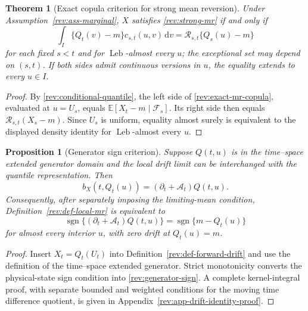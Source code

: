 \documentclass[11pt]{article}
\newtheorem{theorem}[definition]{Theorem}
\newtheorem{proposition}[definition]{Proposition}
\theoremstyle{remark}
\newcommand{\E}{\mathbb E}
\newcommand{\dd}{\,\mathrm d}
\newcommand{\sgn}{\operatorname{sgn}}
\newcommand{\Leb}{\operatorname{Leb}}
\begin{document}
\begin{theorem}[Exact copula criterion for strong mean reversion]
\label{rev:thm-exact-mr}
Under Assumption~\ref{rev:ass-marginal}, $X$ satisfies
\eqref{rev:strong-mr} if and only if
\begin{equation}
\int_I\{Q_t(v)-m\}c_{s,t}(u,v)\dd v
=\mathcal R_{s,t}\{Q_s(u)-m\}
\label{rev:exact-mr-copula}
\end{equation}
for each fixed $s<t$ and for $\Leb$-almost every $u$; the exceptional set may
depend on $(s,t)$.  If both sides admit continuous versions in $u$, the equality
extends to every $u\in I$.
\end{theorem}

\begin{proof}
By \eqref{rev:conditional-quantile}, the left side of
\eqref{rev:exact-mr-copula}, evaluated at $u=U_s$, equals
$\E[X_t-m\mid\mathcal F_s]$.  Its right side then equals
$\mathcal R_{s,t}(X_s-m)$.  Since $U_s$ is uniform, equality almost surely is
equivalent to the displayed density identity for $\Leb$-almost every $u$.
\end{proof}

\begin{proposition}[Generator sign criterion]
\label{rev:prop-generator-sign}
Suppose $Q(t,u)$ is in the time--space extended generator domain and the local
drift limit can be interchanged with the quantile representation.  Then
\begin{equation}
b_X(t,Q_t(u))=(\partial_t+\mathcal A_t)Q(t,u).
\label{rev:drift-quantile-generator}
\end{equation}
Consequently, after separately imposing the limiting-mean condition,
Definition~\ref{rev:def-local-mr} is equivalent to
\begin{equation}
\sgn\{(\partial_t+\mathcal A_t)Q(t,u)\}
=\sgn\{m-Q_t(u)\}
\label{rev:generator-sign}
\end{equation}
for almost every interior $u$, with zero drift at $Q_t(u)=m$.
\end{proposition}

\begin{proof}
Insert $X_t=Q_t(U_t)$ into Definition~\ref{rev:def-forward-drift} and use the
definition of the time--space extended generator.  Strict monotonicity converts
the physical-state sign condition into \eqref{rev:generator-sign}.
A complete kernel-integral proof, with separate bounded and weighted conditions
for the moving time difference quotient, is given in
Appendix~\ref{rev:app-drift-identity-proof}.
\end{proof}
\end{document}
